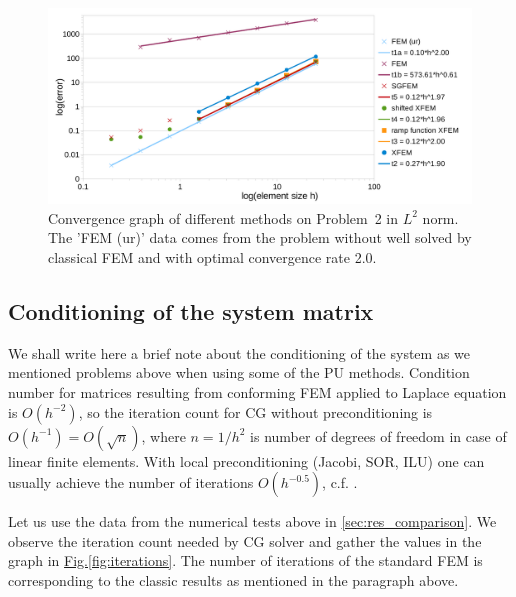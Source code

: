 \documentclass{elsarticle}
\newcommand{\prob}[1]{Problem~{#1}}
\newcommand{\fig}[1]{\hyperref[#1]{Fig.\ref{#1}}}
\begin{document}
\begin{figure}[!htb]
  \centering    
  \includegraphics[width=\textwidth]{results/convergence_sin.pdf}
  \caption[Convergence graph \prob{2}]{Convergence graph of different methods on 
  \prob{2} in $L^2$ norm. The 'FEM (ur)'
  data comes from the problem without well solved by classical FEM and with optimal convergence rate 2.0.}
  \label{fig:convergence_sin}
\end{figure}

\subsection{Conditioning of the system matrix} \label{sec:res_conditioning}
We shall write here a brief note about the conditioning of the system as we mentioned problems above when using some of the PU methods. 
Condition number for matrices resulting from conforming FEM applied to Laplace equation is $O(h^{-2})$, so the iteration count 
for CG without preconditioning is $O(h^{-1})=O(\sqrt{n})$, where $n=1/h^2$ is number of degrees of freedom in case of linear finite elements. 
With local preconditioning (Jacobi, 
SOR, ILU) one can usually achieve the number of iterations $O(h^{-0.5})$, c.f. \cite{ern_evaluation_2006}.

Let us use the data from the numerical tests above in \ref{sec:res_comparison}.
We observe the iteration count needed by CG solver and gather the values in the graph in \fig{fig:iterations}.
The number of iterations of the standard FEM is corresponding to the classic results as mentioned in the paragraph above. 
\end{document}
